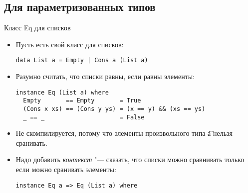 \subsection{Для параметризованных типов}
\begin{frame}[fragile]{Класс Eq для списков}
	\begin{itemize}
		\item Пусть есть свой класс для списков:
\begin{verbatim}
data List a = Empty | Cons a (List a)
\end{verbatim}
		\item Разумно считать, что списки равны, если равны элементы:
\begin{verbatim}
instance Eq (List a) where
  Empty       == Empty       = True
  (Cons x xs) == (Cons y ys) = (x == y) && (xs == ys)
  _ == _                     = False
\end{verbatim}
		\item Не скомпилируется, потому что элементы произвольного типа \t{a} нельзя сранивать.
		\item Надо добавить \textit{контекст} "--- сказать, что списки можно сравнивать только если можно сранивать элементы:
\begin{verbatim}
instance Eq a => Eq (List a) where
\end{verbatim}
	\end{itemize}
\end{frame}
